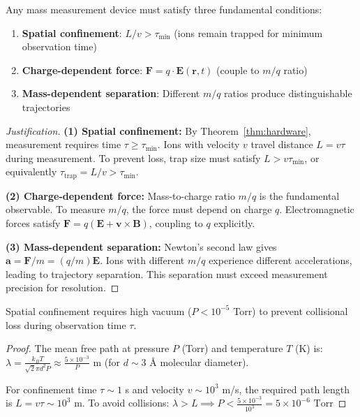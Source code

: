 \begin{axiom}
\label{axiom:ms}
Any mass measurement device must satisfy three fundamental conditions:
\begin{enumerate}
    \item \textbf{Spatial confinement}: $L/v > \tau_{\min}$ (ions remain trapped for minimum observation time)
    \item \textbf{Charge-dependent force}: $\mathbf{F} = q \cdot \mathbf{E}(\mathbf{r}, t)$ (couple to $m/q$ ratio)
    \item \textbf{Mass-dependent separation}: Different $m/q$ ratios produce distinguishable trajectories
\end{enumerate}
\end{axiom}

\begin{proof}[Justification]
\textbf{(1) Spatial confinement:} By Theorem~\ref{thm:hardware}, measurement requires time $\tau \geq \tau_{\min}$. Ions with velocity $v$ travel distance $L = v\tau$ during measurement. To prevent loss, trap size must satisfy $L > v\tau_{\min}$, or equivalently $\tau_{\mathrm{trap}} = L/v > \tau_{\min}$.

\textbf{(2) Charge-dependent force:} Mass-to-charge ratio $m/q$ is the fundamental observable. To measure $m/q$, the force must depend on charge $q$. Electromagnetic forces satisfy $\mathbf{F} = q(\mathbf{E} + \mathbf{v} \times \mathbf{B})$, coupling to $q$ explicitly.

\textbf{(3) Mass-dependent separation:} Newton's second law gives $\mathbf{a} = \mathbf{F}/m = (q/m)\mathbf{E}$. Ions with different $m/q$ experience different accelerations, leading to trajectory separation. This separation must exceed measurement precision for resolution.
\end{proof}

\begin{corollary}
\label{cor:vacuum}
Spatial confinement requires high vacuum ($P < 10^{-5}$ Torr) to prevent collisional loss during observation time $\tau$.
\end{corollary}

\begin{proof}
The mean free path at pressure $P$ (Torr) and temperature $T$ (K) is:
$
\lambda = \frac{k_B T}{\sqrt{2}\pi d^2 P} \approx \frac{5 \times 10^{-3}}{P} \text{ m}
$
(for $d \sim 3$ Å molecular diameter).

For confinement time $\tau \sim 1$ s and velocity $v \sim 10^3$ m/s, the required path length is $L = v\tau \sim 10^3$ m. To avoid collisions:
$
\lambda > L \implies P < \frac{5 \times 10^{-3}}{10^3} = 5 \times 10^{-6} \text{ Torr}
$
\end{proof}

